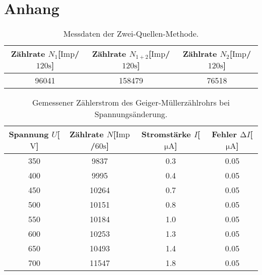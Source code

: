\section{Anhang}

\begin{table}
\centering
\caption{Messdaten der Zwei-Quellen-Methode.}
\label{tab:ogemessdaten3}
\begin{tabular}{c c c}
    \toprule
    Zählrate $N_{1}$[$\text{Imp}$/$120\si{\second}$] & Zählrate $N_{1+2}$[$\text{Imp}$/$120\si{\second}$] & Zählrate $N_{2}$[$\text{Imp}$/$120\si{\second}$]\\
    \midrule
    96041 & 158479 & 76518 \\
    \bottomrule
\end{tabular}
\end{table}

\begin{table}
\centering
\caption{Gemessener Zählerstrom des Geiger-Müllerzählrohrs bei Spannungsänderung.}
\label{tab:ogemessdaten2}
\begin{tabular}{c c c c}
    \toprule
    Spannung $U$[$\si{\volt}$] & Zählrate $N$[$\text{Imp}$/$60\si{\second}$] & Stromstärke $I$[$\si{\micro\ampere}$] & Fehler $\increment I$[$\si{\micro\ampere}$]\\
    \midrule
    350  & 9837 & 0.3 & 0.05\\
    400	 & 9995 & 0.4 & 0.05\\
    450	 & 10264 & 0.7 & 0.05\\
    500	 & 10151 & 0.8 & 0.05\\
    550	 & 10184 & 1.0 & 0.05\\
    600	 & 10253 & 1.3 & 0.05\\
    650	 & 10493 & 1.4 & 0.05\\
    700	 & 11547 & 1.8 & 0.05\\
    \bottomrule
\end{tabular}
\end{table}


